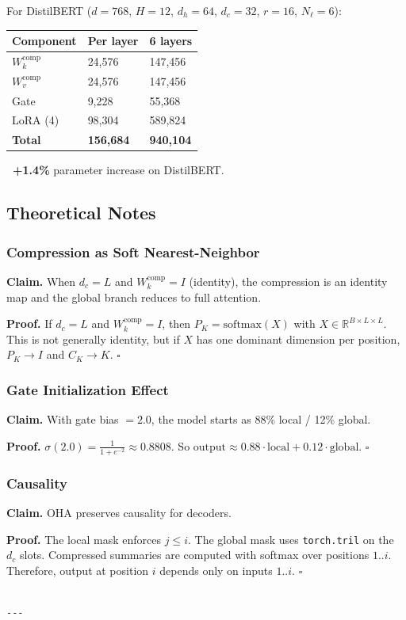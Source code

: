 For DistilBERT ($d = 768$, $H = 12$, $d_h = 64$, $d_c = 32$, $r = 16$, 
$N_\ell = 6$):

\begin{table}[H]
\centering
\small
\begin{tabular}{lll}
\toprule
\textbf{Component} & \textbf{Per layer} & \textbf{6 layers} \\
\midrule
$W_k^\text{comp}$ & 24,576 & 147,456 \\
$W_v^\text{comp}$ & 24,576 & 147,456 \\
Gate & 9,228 & 55,368 \\
LoRA (4) & 98,304 & 589,824 \\
\textbf{Total} & \textbf{156,684} & \textbf{940,104} \\
\bottomrule
\end{tabular}
\end{table}

\textbf{~+1.4\%} parameter increase on DistilBERT.

\subsection{Theoretical Notes}

\subsubsection{Compression as Soft Nearest-Neighbor}

\textbf{Claim.} When $d_c = L$ and $W_k^\text{comp} = I$ (identity), the 
compression is an identity map and the global branch reduces to full 
attention.

\textbf{Proof.} If $d_c = L$ and $W_k^\text{comp} = I$, then $P_K = \text{softmax}(X)$ 
with $X \in \mathbb{R}^{B \times L \times L}$. This is not generally identity, 
but if $X$ has one dominant dimension per position, $P_K \to I$ and $C_K \to K$. $\square$

\subsubsection{Gate Initialization Effect}

\textbf{Claim.} With gate bias $= 2.0$, the model starts as 88\% local / 12\% global.

\textbf{Proof.} $\sigma(2.0) = \frac{1}{1 + e^{-2}} \approx 0.8808$. So 
$\text{output} \approx 0.88 \cdot \text{local} + 0.12 \cdot \text{global}$. $\square$

\subsubsection{Causality}

\textbf{Claim.} OHA preserves causality for decoders.

\textbf{Proof.} The local mask enforces $j \leq i$. The global mask uses 
\texttt{torch.tril} on the $d_c$ slots. Compressed summaries are computed with 
softmax over positions $1..i$. Therefore, output at position $i$ depends 
only on inputs $1..i$. $\square$
\begin{lstlisting}

---
\end{lstlisting}